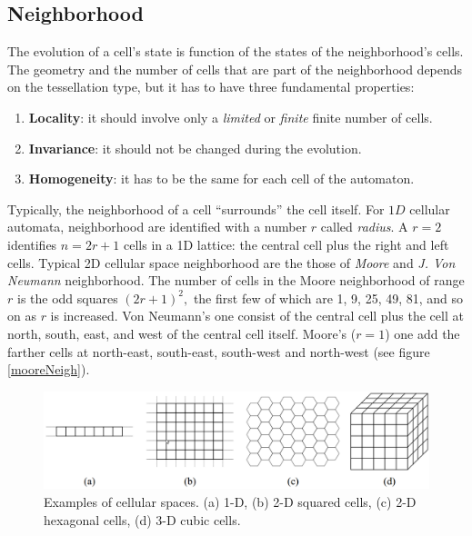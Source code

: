 \subsection{Neighborhood}
The evolution of a cell's state is function of the states of the neighborhood's
cells. The geometry and the number of cells that are part of the neighborhood
depends on the tessellation type, but it has to have three fundamental
properties:
\begin{enumerate}
  \item \textbf{Locality}: it should involve only a \textit{limited} or \textit{finite} finite number of cells.
  \item \textbf{Invariance}: it should not be changed during the evolution.
  \item \textbf{Homogeneity}: it has to be the same for each cell of the
  automaton.
\end{enumerate}
Typically, the neighborhood of a cell ``surrounds'' the cell itself. For $1D$ cellular automata, neighborhood are identified with a number \begin{math}r\end{math} called
\textit{radius}\cite{wolfram1983}. A \begin{math}r=2\end{math} identifies
\begin{math}n=2r+1\end{math} cells in a 1D lattice: the central cell plus the
right and left cells. Typical 2D cellular space neighborhood are the those of
\textit{Moore} and \textit{J. Von Neumann} neighborhood. The number of cells in the Moore neighborhood of range $r$ is the odd squares \begin{math}(2r+1)^2,\end{math} the
first few of which are 1, 9, 25, 49, 81, and so on as $r$ is increased.
Von Neumann's one consist of the central cell plus the cell at north, south,
east, and west of the central cell itself. Moore's (\begin{math}r=1\end{math})
one add  the farther cells at north-east, south-east, south-west and north-west
(see figure \ref{mooreNeigh}).


\begin{figure}
	\centering
	\caption{Examples of cellular spaces. (a) 1-D, (b) 2-D squared cells,
		(c) 2-D hexagonal cells, (d) 3-D cubic cells.}\label{spazioCellulare}
	\includegraphics[scale=0.23]{./images/CA_FDM/spazioCellulare}
\end{figure}

